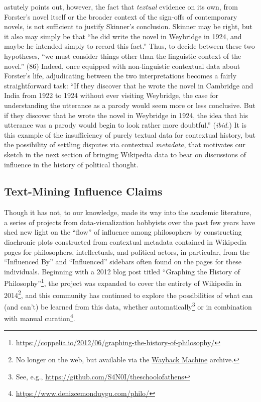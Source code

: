\documentclass[11pt]{article}
\begin{document}
\cite{bevir_logic_1999} astutely points out, however, the fact that \textit{textual} evidence on its own, from Forster's novel itself or the broader context of the sign-offs of contemporary novels, is not sufficient to justify Skinner's conclusion. Skinner may be right, but it also may simply be that ``he did write the novel in Weybridge in 1924, and maybe he intended simply to record this fact.'' Thus, to decide between these two hypotheses, ``we must consider things other than the linguistic context of the novel.'' (86) Indeed, once equipped with non-linguistic contextual data about Forster's life, adjudicating between the two interpretations becomes a fairly straightforward task: ``If they discover that he wrote the novel in Cambridge and India from 1922 to 1924 without ever visiting Weybridge, the case for understanding the utterance as a parody would seem more or less conclusive. But if they discover that he wrote the novel in Weybridge in 1924, the idea that his utterance was a parody would begin to look rather more doubtful.'' (\textit{ibid.}) It is this example of the insufficiency of purely textual data for contextual history, but the possibility of settling disputes via contextual \textit{metadata}, that motivates our sketch in the next section of bringing Wikipedia data to bear on discussions of influence in the history of political thought.

\subsection{Text-Mining Influence Claims}\label{sec:mining-influence-claims}

Though it has not, to our knowledge, made its way into the academic literature, a series of projects from data-visualization hobbyists over the past few years have shed new light on the ``flow'' of influence among philosophers by constructing diachronic plots constructed from contextual metadata contained in Wikipedia pages for philosophers, intellectuals, and political actors, in particular, from the ``Influenced By'' and ``Influenced'' sidebars often found on the pages for these individuals. Beginning with a 2012 blog post titled ``Graphing the History of Philosophy''\footnote{\href{https://coppelia.io/2012/06/graphing-the-history-of-philosophy/}{https://coppelia.io/2012/06/graphing-the-history-of-philosophy/}}, the project was expanded to cover the entirety of Wikipedia in 2014\footnote{No longer on the web, but available via the \href{http://web.archive.org/web/20150430033748/http://brendangriffen.com/blog/gow-influential-thinkers/}{Wayback Machine} archive.}, and this community has continued to explore the possibilities of what can (and can't) be learned from this data, whether automatically\footnote{See, e.g., \href{https://github.com/S4N0I/theschoolofathens}{https://github.com/S4N0I/theschoolofathens}} or in combination with manual curation\footnote{\href{https://www.denizcemonduygu.com/philo/}{https://www.denizcemonduygu.com/philo/}}.
\end{document}

